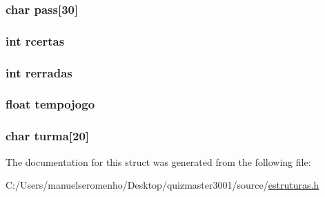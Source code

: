 \hypertarget{structalunotab_a9ecdcb8aa2df05bd6ed832156a1a4c7e}{
\subsubsection[{pass}]{\setlength{\rightskip}{0pt plus 5cm}char pass\mbox{[}30\mbox{]}}}\label{structalunotab_a9ecdcb8aa2df05bd6ed832156a1a4c7e}
\hypertarget{structalunotab_a33bf6e16a78990a2b2d342483bac9a68}{
\subsubsection[{rcertas}]{\setlength{\rightskip}{0pt plus 5cm}int rcertas}}\label{structalunotab_a33bf6e16a78990a2b2d342483bac9a68}
\hypertarget{structalunotab_afada030668b28f4d296f891aa53344c5}{
\subsubsection[{rerradas}]{\setlength{\rightskip}{0pt plus 5cm}int rerradas}}\label{structalunotab_afada030668b28f4d296f891aa53344c5}
\hypertarget{structalunotab_a3de22f50610e62bbdc72498b64622177}{
\subsubsection[{tempojogo}]{\setlength{\rightskip}{0pt plus 5cm}float tempojogo}}\label{structalunotab_a3de22f50610e62bbdc72498b64622177}
\hypertarget{structalunotab_adf62f1a9af1a2877f344edf62a10a24f}{
\subsubsection[{turma}]{\setlength{\rightskip}{0pt plus 5cm}char turma\mbox{[}20\mbox{]}}}\label{structalunotab_adf62f1a9af1a2877f344edf62a10a24f}


The documentation for this struct was generated from the following file\+:\begin{DoxyCompactItemize}
\item 
C\+:/\+Users/manuelseromenho/\+Desktop/quizmaster3001/source/\hyperlink{estruturas_8h}{estruturas.\+h}\end{DoxyCompactItemize}
